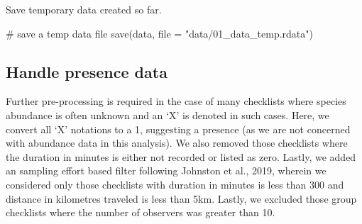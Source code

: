 \documentclass[]{article}
\newenvironment{Shaded}{}{}
\newcommand{\CommentTok}[1]{\textcolor[rgb]{0.00,0.50,0.00}{#1}}
\newcommand{\DataTypeTok}[1]{#1}
\newcommand{\KeywordTok}[1]{\textcolor[rgb]{0.00,0.00,1.00}{#1}}
\newcommand{\NormalTok}[1]{#1}
\newcommand{\StringTok}[1]{\textcolor[rgb]{0.00,0.50,0.50}{#1}}
\begin{document}
Save temporary data created so far.

\begin{Shaded}
\begin{Highlighting}[numbers=left,,]
\CommentTok{# save a temp data file}
\KeywordTok{save}\NormalTok{(data, }\DataTypeTok{file =} \StringTok{"data/01_data_temp.rdata"}\NormalTok{)}
\end{Highlighting}
\end{Shaded}

\hypertarget{handle-presence-data}{%
\subsection{Handle presence data}\label{handle-presence-data}}

Further pre-processing is required in the case of many checklists where species abundance is often unknown and an `X' is denoted in such cases. Here, we convert all `X' notations to a 1, suggesting a presence (as we are not concerned with abundance data in this analysis). We also removed those checklists where the duration in minutes is either not recorded or listed as zero. Lastly, we added an sampling effort based filter following Johnston et al., 2019, wherein we considered only those checklists with duration in minutes is less than 300 and distance in kilometres traveled is less than 5km. Lastly, we excluded those group checklists where the number of observers was greater than 10.
\end{document}

